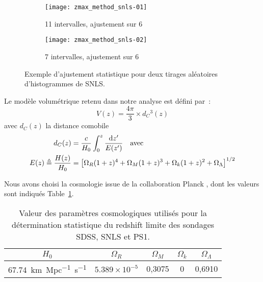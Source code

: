 \documentclass[../main/main.tex]{subfiles}
\begin{document}
\begin{figure}[ht]
    \centering
    \begin{subfigure}[]{.49\linewidth}
        \centering
        \texttt{[image: zmax\_method\_snls-01]}
        \captionsetup{justification=centering}
        \caption{11 intervalles, ajustement sur 6}
        \label{fig:zmax_method1}
    \end{subfigure}
    \begin{subfigure}[]{.49\linewidth}
        \centering
        \texttt{[image: zmax\_method\_snls-02]}
        \captionsetup{justification=centering}
        \caption{7 intervalles, ajustement sur 6}
        \label{fig:zmax_method2}
    \end{subfigure}
    \captionsetup{justification=centering}
    \caption{Exemple d'ajustement statistique pour deux tirages aléatoires
    d'histogrammes de SNLS.}
    \label{fig:zmax_method}
\end{figure}


Le modèle volumétrique retenu dans notre analyse est défini par~:
\begin{equation}\label{eq:comobvol}
    V(z) = \frac{4\pi}{3}\times d_C{}^3(z)
\end{equation}
avec $d_C(z)$ la distance comobile
\begin{align}
    d_C(z)                           & =
    \frac{c}{H_0} \int_{0}^{z} \frac{\mathrm{d} z'}{E(z')}
    \quad\text{avec}\quad\\
    E(z) \triangleq \frac{H(z)}{H_0} & =
    \left[\Omega_R(1+z)^4 + \Omega_M(1+z)^3 +
        \Omega_k(1+z)^2 + \Omega_\Lambda
    \right]^{1/2}
\end{align}

Nous avons choisi la cosmologie issue de la collaboration Planck
\citep{planck2018}, dont les valeurs sont indiqués Table~\ref{tab:planckvals}.

\begin{table}[ht]
    \centering
    \caption[Valeur des paramètres cosmologiques utilisés pour la détermination
    statistique du redshift limite des sondages SDSS, SNLS et PS1]{Valeur des
        paramètres cosmologiques utilisés pour la détermination statistique du
    redshift limite des sondages SDSS, SNLS et PS1.}
    \label{tab:planckvals}
    \begin{tabular}{ccccc}
        \toprule
        $H_0$ &
        $\Omega_R$ & $\Omega_M$ & $\Omega_k$ & $\Omega_\Lambda$ \\
        \midrule
        \SI{67,74}{km.Mpc^{-1}.s^{-1}} &
        $5.389\times10^{-5}$ & 0,3075 & 0 & 0,6910 \\ 
        \bottomrule
    \end{tabular}
\end{table}
\end{document}
